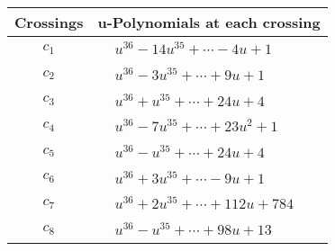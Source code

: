 \documentclass[1p]{elsarticle_modified}
\theoremstyle{definition}
\begin{document}
\begin{tabular}{m{50pt}|m{274pt}}
Crossings & \hspace{64pt}u-Polynomials at each crossing \\
\hline $$\begin{aligned}c_{1}\end{aligned}$$&$\begin{aligned}
&u^{36}-14 u^{35}+\cdots-4 u+1
\end{aligned}$\\
\hline $$\begin{aligned}c_{2}\end{aligned}$$&$\begin{aligned}
&u^{36}-3 u^{35}+\cdots+9 u+1
\end{aligned}$\\
\hline $$\begin{aligned}c_{3}\end{aligned}$$&$\begin{aligned}
&u^{36}+u^{35}+\cdots+24 u+4
\end{aligned}$\\
\hline $$\begin{aligned}c_{4}\end{aligned}$$&$\begin{aligned}
&u^{36}-7 u^{35}+\cdots+23 u^2+1
\end{aligned}$\\
\hline $$\begin{aligned}c_{5}\end{aligned}$$&$\begin{aligned}
&u^{36}- u^{35}+\cdots+24 u+4
\end{aligned}$\\
\hline $$\begin{aligned}c_{6}\end{aligned}$$&$\begin{aligned}
&u^{36}+3 u^{35}+\cdots-9 u+1
\end{aligned}$\\
\hline $$\begin{aligned}c_{7}\end{aligned}$$&$\begin{aligned}
&u^{36}+2 u^{35}+\cdots+112 u+784
\end{aligned}$\\
\hline $$\begin{aligned}c_{8}\end{aligned}$$&$\begin{aligned}
&u^{36}- u^{35}+\cdots+98 u+13
\end{aligned}$\\

\end{tabular}
\end{document}
